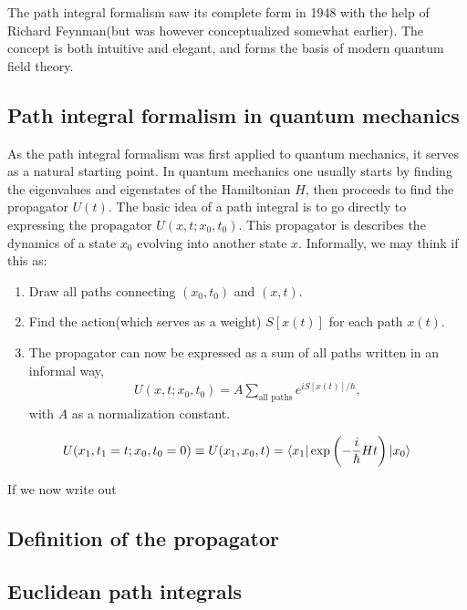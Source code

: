 The path integral formalism saw its complete form in 1948 with the help of Richard Feynman\cite{RevModPhys.20.367}(but was however conceptualized somewhat earlier). The concept is both intuitive and elegant, and forms the basis of modern quantum field theory.

\subsection{Path integral formalism in quantum mechanics}
As the path integral formalism was first applied to quantum mechanics, it serves as a natural starting point. In quantum mechanics one usually starts by finding the eigenvalues and eigenstates of the Hamiltonian $H$, then proceeds to find the propagator $U(t)$. The basic idea of a path integral is to go directly to expressing the propagator $U(x,t;x_0,t_0)$. This propagator is describes the dynamics of a state $x_0$ evolving into another state $x$. Informally, we may think if this as:

\begin{enumerate}
	\item Draw all paths connecting $(x_0,t_0)$ and $(x,t)$.
	\item Find the action(which serves as a weight) $S[x(t)]$ for each path $x(t)$.
	\item The propagator can now be expressed as a sum of all paths written in an informal way,
	\begin{align*}
		U(x,t;x_0,t_0) = A \sum_\text{all paths} e^{iS[x(t)]/\hbar},
	\end{align*}
	with $A$ as a normalization constant.
\end{enumerate}

\begin{align}
	U(x_1,t_1=t;x_0,t_0=0) \equiv U(x_1,x_0,t) = \langle{x_1}| \exp \left( -\frac{i}{\hbar} H t \right) |{x_0}\rangle
	\label{eq:propagator-definition-qm}
\end{align}

If we now write out 

\subsection{Definition of the propagator}

\subsection{Euclidean path integrals}

